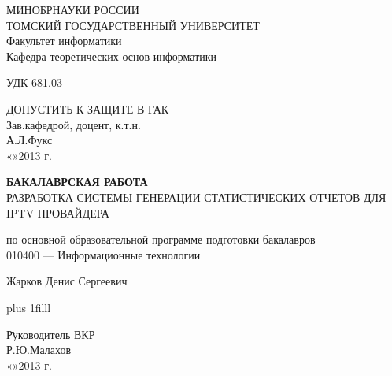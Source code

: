 \normalsize
\thispagestyle{empty}
\begin{center}
МИНОБРНАУКИ РОССИИ\\
ТОМСКИЙ ГОСУДАРСТВЕННЫЙ УНИВЕРСИТЕТ\\
Факультет информатики\\
Кафедра теоретических основ информатики\\
\end{center}

\vspace{0.7cm}

УДК 681.03

\vspace{0.5cm}

\begin{flushright}
ДОПУСТИТЬ К ЗАЩИТЕ В ГАК\\
Зав.кафедрой, доцент, к.т.н.\\
\makebox[3cm]{\hrulefill}А.Л.Фукс\\
«\makebox[0.8cm]{\hrulefill}»\makebox[1.5cm]{\hrulefill}2013 г.\\
\end{flushright}



\begin{center}

\vspace{1.5cm}
{\bf БАКАЛАВРСКАЯ РАБОТА}\\
\vspace{0.5cm}
РАЗРАБОТКА СИСТЕМЫ ГЕНЕРАЦИИ СТАТИСТИЧЕСКИХ ОТЧЕТОВ ДЛЯ IPTV ПРОВАЙДЕРА

\vspace{0.5cm}
по основной образовательной программе подготовки бакалавров\\
010400 --- Информационные технологии

\vspace{0.5cm}

Жарков Денис Сергеевич

\end{center}

\vskip 0pt plus 1filll

\begin{tabbing}
\hspace{10cm}\=Руководитель ВКР\\
\>\makebox[3cm]{\hrulefill}Р.Ю.Малахов\\
\>«\makebox[0.8cm]{\hrulefill}»\makebox[1.5cm]{\hrulefill}2013 г.\\
\end{tabbing}

